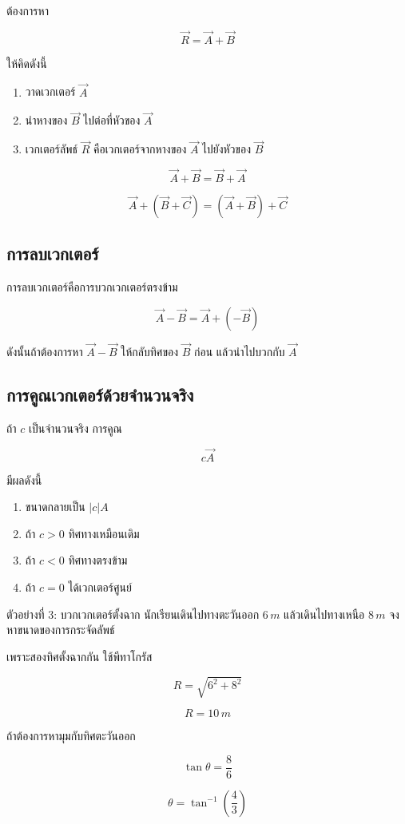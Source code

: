 ต้องการหา

\[
\vec{R}=\vec{A}+\vec{B}
\]

ให้คิดดังนี้

\begin{enumerate}
    \item วาดเวกเตอร์ $\vec{A}$
    \item นำหางของ $\vec{B}$ ไปต่อที่หัวของ $\vec{A}$
    \item เวกเตอร์ลัพธ์ $\vec{R}$ คือเวกเตอร์จากหางของ $\vec{A}$ ไปยังหัวของ $\vec{B}$
\end{enumerate}

\begin{tcolorbox}[title=กฎการบวกเวกเตอร์]
\[
\vec{A}+\vec{B}=\vec{B}+\vec{A}
\]

\[
\vec{A}+(\vec{B}+\vec{C})=(\vec{A}+\vec{B})+\vec{C}
\]
\end{tcolorbox}

\subsection{การลบเวกเตอร์}

การลบเวกเตอร์คือการบวกเวกเตอร์ตรงข้าม

\[
\vec{A}-\vec{B}=\vec{A}+(-\vec{B})
\]

ดังนั้นถ้าต้องการหา $\vec{A}-\vec{B}$ ให้กลับทิศของ $\vec{B}$ ก่อน แล้วนำไปบวกกับ $\vec{A}$

\subsection{การคูณเวกเตอร์ด้วยจำนวนจริง}

ถ้า $c$ เป็นจำนวนจริง การคูณ

\[
c\vec{A}
\]

มีผลดังนี้

\begin{enumerate}
    \item ขนาดกลายเป็น $|c|A$
    \item ถ้า $c>0$ ทิศทางเหมือนเดิม
    \item ถ้า $c<0$ ทิศทางตรงข้าม
    \item ถ้า $c=0$ ได้เวกเตอร์ศูนย์
\end{enumerate}

\begin{examplebox}{ตัวอย่างที่ 3: บวกเวกเตอร์ตั้งฉาก}
นักเรียนเดินไปทางตะวันออก $6\,\si{m}$ แล้วเดินไปทางเหนือ $8\,\si{m}$ จงหาขนาดของการกระจัดลัพธ์

เพราะสองทิศตั้งฉากกัน ใช้พีทาโกรัส

\[
R=\sqrt{6^2+8^2}
\]

\[
R=10\,\si{m}
\]

ถ้าต้องการหามุมกับทิศตะวันออก

\[
\tan\theta=\frac{8}{6}
\]

\[
\theta=\tan^{-1}\left(\frac{4}{3}\right)
\]
\end{examplebox}

